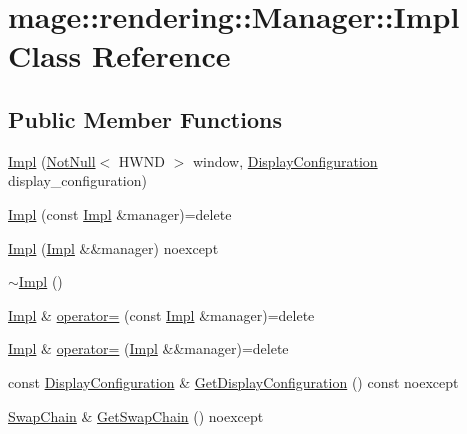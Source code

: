 \hypertarget{classmage_1_1rendering_1_1_manager_1_1_impl}{}\section{mage\+:\+:rendering\+:\+:Manager\+:\+:Impl Class Reference}
\label{classmage_1_1rendering_1_1_manager_1_1_impl}
\subsection*{Public Member Functions}
\begin{DoxyCompactItemize}
\item 
\hyperlink{classmage_1_1rendering_1_1_manager_1_1_impl_aaed30d537e5fd07c2f6a9ac0382c9238}{Impl} (\hyperlink{namespacemage_a8769f9d670d6b585ea306cb1062af94b}{Not\+Null}$<$ H\+W\+ND $>$ window, \hyperlink{classmage_1_1rendering_1_1_display_configuration}{Display\+Configuration} display\+\_\+configuration)
\item 
\hyperlink{classmage_1_1rendering_1_1_manager_1_1_impl_a73004bf6e59f4fb38257e4ca30bca8a0}{Impl} (const \hyperlink{classmage_1_1rendering_1_1_manager_1_1_impl}{Impl} \&manager)=delete
\item 
\hyperlink{classmage_1_1rendering_1_1_manager_1_1_impl_af9164e13dda6ab8b553e58c62ca79378}{Impl} (\hyperlink{classmage_1_1rendering_1_1_manager_1_1_impl}{Impl} \&\&manager) noexcept
\item 
\hyperlink{classmage_1_1rendering_1_1_manager_1_1_impl_a34e0d4635b02ea40cc01847d0e1a4fb7}{$\sim$\+Impl} ()
\item 
\hyperlink{classmage_1_1rendering_1_1_manager_1_1_impl}{Impl} \& \hyperlink{classmage_1_1rendering_1_1_manager_1_1_impl_a2367cc9262863faeed5166bd53ba52c0}{operator=} (const \hyperlink{classmage_1_1rendering_1_1_manager_1_1_impl}{Impl} \&manager)=delete
\item 
\hyperlink{classmage_1_1rendering_1_1_manager_1_1_impl}{Impl} \& \hyperlink{classmage_1_1rendering_1_1_manager_1_1_impl_a3dfc877c5737abc5020cf700dec8eb60}{operator=} (\hyperlink{classmage_1_1rendering_1_1_manager_1_1_impl}{Impl} \&\&manager)=delete
\item 
const \hyperlink{classmage_1_1rendering_1_1_display_configuration}{Display\+Configuration} \& \hyperlink{classmage_1_1rendering_1_1_manager_1_1_impl_a413668c5240857bf38197fc8a700ceab}{Get\+Display\+Configuration} () const noexcept
\item 
\hyperlink{classmage_1_1rendering_1_1_swap_chain}{Swap\+Chain} \& \hyperlink{classmage_1_1rendering_1_1_manager_1_1_impl_aa2f6c98780d9e035ae1eb3822e5e3810}{Get\+Swap\+Chain} () noexcept

\end{DoxyCompactItemize}
